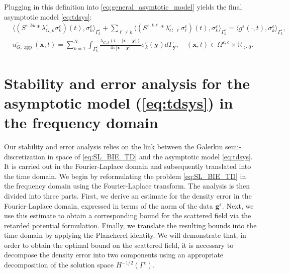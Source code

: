 \documentclass[]{article}
\numberwithin{equation}{section}
\numberwithin{theorem}{section}
\numberwithin{lemma}{section}
\numberwithin{corollary}{section}
\numberwithin{proposition}{section}
\numberwithin{definition}{section}
\newcommand{\re}{\varepsilon}
\renewcommand{\vec}{\boldsymbol}
\begin{document}
	Plugging in this definition into \eqref{eq:general_asymtotic_model} yields the final asymptotic model \eqref{eq:tdsys}:
	\begin{align}
		\label{eq:final_asymtotic_model}
		&\langle (S^{\re, kk} * \lambda^{\re}_{G,k} \sigma^{\re}_k) (t) , \sigma^{\re}_k \rangle_{\Gamma^{\re}_k} + \sum_{\ell\neq k} \langle (S^{\re, k\ell}  *\lambda^{\re}_{G, \ell} \sigma^{\re}_{\ell})(t) , \sigma^{\re}_k \rangle_{\Gamma^{\re}_k} = \langle g^{\re}(\cdot, t), \sigma^{\re}_k  \rangle_{\Gamma^{\re}_k},\\ 
		&u^{\re}_{G,\operatorname{\operatorname{app}}}(\vec{x},t)=\sum\limits_{k=1}^N\int_{\Gamma_k^{\re}}\frac{\lambda_{G,k}(t-|\vec{x}-\vec{y}|)}{4\pi|\vec{x}-\vec{y}|}\sigma_k^{\re}(\vec{y})d\Gamma_{\vec{y}}, \quad (\vec{x},t)\in \Omega^{\re,c}\times \mathbb{R}_{>0}.
	\end{align}
	
	\section{Stability and error analysis for the asymptotic model (\ref{eq:tdsys}) in the frequency domain}
	Our stability and error analysis relies on the link between the Galerkin semi-discretization in space of \eqref{eq:SL_BIE_TD} and the asymptotic model \eqref{eq:tdsys}. It is carried out in the Fourier-Laplace domain and subsequently translated into the time domain. We begin by reformulating the problem \eqref{eq:SL_BIE_TD} in the frequency domain using the Fourier-Laplace transform. The analysis is then divided into three parts. First, we derive an estimate for the density error in the Fourier-Laplace domain, expressed in terms of the norm of the data $\vec{g}^{\re}$. Next, we use this estimate to obtain a corresponding bound for the scattered field via the retarded potential formulation. Finally, we translate the resulting bounds into the time domain by applying the Plancherel identity. We will demonstrate that, in order to obtain the optimal bound on the scattered field, it is necessary to decompose the density error into two components using an appropriate decomposition of the solution space $H^{-1/2}(\Gamma^{\re})$.
	
\end{document}
